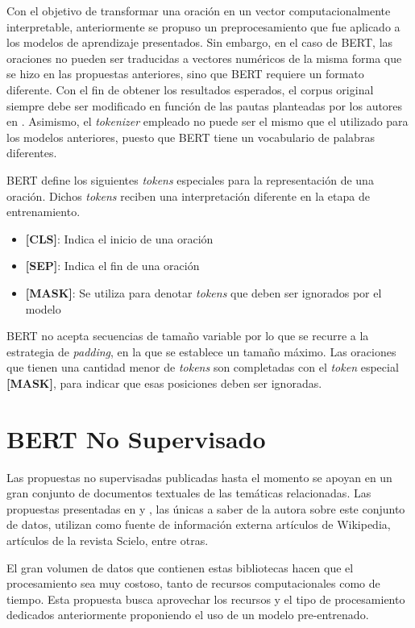 Con el objetivo de transformar una oración en un vector computacionalmente interpretable, anteriormente se propuso un preprocesamiento que fue aplicado a los modelos de aprendizaje presentados. Sin embargo, en el caso de BERT, las oraciones no pueden ser traducidas a vectores numéricos de la misma forma que se hizo en las propuestas anteriores, sino que BERT requiere un formato diferente. Con el fin de obtener los resultados esperados, el corpus original siempre debe ser modificado en función de las pautas planteadas por los autores en \cite{2018-devlin-bert}. Asimismo, el \textit{tokenizer} empleado no puede ser el mismo que el utilizado para los modelos anteriores, puesto que BERT tiene un vocabulario de palabras diferentes.

BERT define los siguientes \textit{tokens} especiales para la representación de una oración. Dichos \textit{tokens} reciben una interpretación diferente en la etapa de entrenamiento.
\begin{itemize}
  \item \textbf{[CLS]}: Indica el inicio de una oración
  \item \textbf{[SEP]}: Indica el fin de una oración
  \item \textbf{[MASK]}: Se utiliza para denotar \textit{tokens} que deben ser ignorados por el modelo
\end{itemize}

BERT no acepta secuencias de tamaño variable por lo que se recurre a la estrategia de \textit{padding}, en la que se establece un tamaño máximo. Las oraciones que tienen una cantidad menor de \textit{tokens} son completadas con el \textit{token} especial \textbf{[MASK]}, para indicar que esas posiciones deben ser ignoradas.

\section{BERT No Supervisado}

Las propuestas no supervisadas publicadas hasta el momento se apoyan en un gran conjunto de documentos textuales de las temáticas relacionadas. Las propuestas presentadas en \cite{2019-head-qa} y \cite{2020-multi-step}, las únicas a saber de la autora sobre este conjunto de datos, utilizan como fuente de información externa artículos de Wikipedia, artículos de la revista Scielo, entre otras. 

El gran volumen de datos que contienen estas bibliotecas hacen que el procesamiento sea muy costoso, tanto de recursos computacionales como de tiempo. Esta propuesta busca aprovechar los recursos y el tipo de procesamiento dedicados anteriormente proponiendo el uso de un modelo pre-entrenado. 

